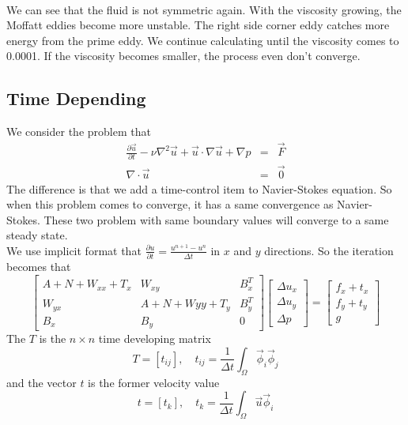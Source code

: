 \documentclass[a4paper]{article}
\begin{document}
\\
We can see that the fluid is not symmetric again. With the viscosity growing, the Moffatt eddies become more unstable. The right side corner eddy catches more energy from the prime eddy. We continue calculating until the viscosity comes to 0.0001. If the viscosity becomes smaller, the process even don't converge.
\subsection{Time Depending}
We consider the problem that
\begin{equation}
\begin{array}{rcl}
\frac{\partial\vec{u}}{\partial t}-\nu \nabla^2 \vec{u} + \vec{u}\cdot \nabla \vec{u} + \nabla p &=& \vec{F} \\
\nabla \cdot \vec{u} &=& \vec{0}
\label{eq::Timedepending-problem}
\end{array}
\end{equation}
The difference is that we add a time-control item to Navier-Stokes equation. So when this problem comes to converge, it has a same convergence as Navier-Stokes. These two problem with same boundary values will converge to a same steady state.\\
We use implicit format that $\frac{\partial u}{\partial t} = \frac{u^{n+1}-u^{n}}{\Delta t}$ in $x$ and $y$ directions. 
So the iteration becomes that 
\begin{equation}
\left[ \begin{array}{ccc}
A + N +W_{xx} + T_x & W_{xy} & B_x^T \\
W_{yx} & A +N +W{yy} + T_y& B_y^T \\
B_x & B_y & 0
\end{array}
\right]
\left[\begin{array}{ccc}
\Delta u_x\\
\Delta u_y\\
\Delta p
\end{array}
\right]=
\left[\begin{array}{ccc}
f_x + t_x\\
f_y + t_y\\
g
\end{array}
\right]
\label{Timedepending}
\end{equation}
The $T$ is the $n\times n$ time developing matrix 
\begin{equation}
T = [t_{ij}],\quad t_{ij}=\frac{1}{\Delta t}\int_{\Omega}\vec{\phi}_i\vec{\phi}_j
\end{equation}
and the vector $t$ is the former velocity value
\begin{equation}
t = [t_{k}],\quad t_{k}=\frac{1}{\Delta t}\int_{\Omega}\vec{u}\vec{\phi}_i
\end{equation}
\end{document}
